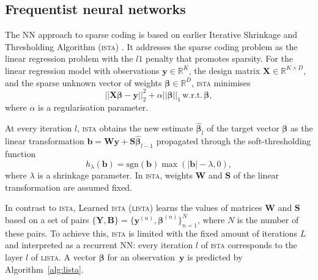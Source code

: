 \documentclass{article}
\begin{document}
\subsection{Frequentist neural networks}
\label{subsec:nn_sc}
  The NN approach to sparse coding is based on earlier Iterative Shrinkage and Thresholding Algorithm (\textsc{ista}) \cite{daubechies2004iterative}. It addresses the sparse coding problem as the linear regression problem with the $l1$ penalty that promotes sparsity. For the linear regression model with observations $\mathbf{y} \in \mathbb{R}^K$, the design matrix $\mathbf{X} \in \mathbb{R}^{K \times D}$, and the sparse unknown vector of weights $\boldsymbol\beta \in \mathbb{R}^D$, \textsc{ista} minimises
  \begin{equation}
  \label{eq:regression_problem}
  ||\mathbf{X}\boldsymbol\beta - \mathbf{y}||_2^2 + \alpha ||\boldsymbol\beta||_1 \, \text{w.r.t.} \,\boldsymbol\beta,
  \end{equation}
  where $\alpha$ is a regularisation parameter.

  At every iteration $l$, \textsc{ista} obtains the new estimate $\widehat{\boldsymbol\beta}_l$ of the target vector $\boldsymbol\beta$ as the linear transformation $\mathbf{b} = \mathbf{W}\mathbf{y} + \mathbf{S}\widehat{\boldsymbol\beta}_{l-1}$ propagated through the soft-thresholding function %
  \begin{equation}
  h_\lambda(\mathbf{b}) = \text{sgn}(\mathbf{b}) \max(|\mathbf{b}| - \lambda, 0),
  \end{equation}
  where $\lambda$ is a shrinkage parameter.
  In \textsc{ista}, weights $\mathbf{W}$ and $\mathbf{S}$ of the linear transformation are assumed fixed.

  In contrast to \textsc{ista}, Learned \textsc{ista} (\textsc{lista}) \cite{gregor2010learning} learns the values of matrices $\mathbf{W}$ and $\mathbf{S}$ based on a set of pairs $\{\mathbf{Y}, \mathbf{B}\}=\{\mathbf{y}^{(n)}, \boldsymbol\beta^{(n)}\}_{n=1}^N$, where $N$ is the number of these pairs. To achieve this, \textsc{ista} is limited with the fixed amount of iterations $L$ and interpreted as a recurrent NN: every iteration $l$ of \textsc{ista} corresponds to the layer $l$ of \textsc{lista}. A vector $\boldsymbol\beta$ for an observation~$\mathbf{y}$ is predicted by Algorithm~\ref{alg:lista}.
\end{document}
